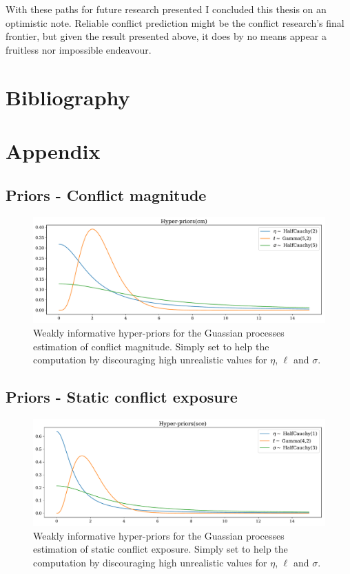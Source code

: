 \documentclass[a4paper]{article}
\begin{document}
With these paths for future research presented I concluded this thesis on an optimistic note. Reliable conflict prediction might be the conflict research's final frontier, but given the result presented above, it does by no means appear a fruitless nor impossible endeavour.\par


\pagebreak

\section{Bibliography}
 


\pagebreak
\section{Appendix}

\subsection{Priors - Conflict magnitude}\label{cmPrior}

\begin{figure}[!htb]
	\centering
	\includegraphics[scale=0.47]{Hyper-priors(cm).pdf}
    \caption{\footnotesize{Weakly informative hyper-priors for the Guassian processes estimation of conflict magnitude. Simply set to help the computation by discouraging high unrealistic values for $\eta$, $\ell$ and $\sigma$.}}
\end{figure}
\pagebreak

\subsection{Priors - Static conflict exposure}\label{scePrior}

\begin{figure}[!htb]
	\centering
	\includegraphics[scale=0.47]{Hyper-priors(sce).pdf}
    \caption{\footnotesize{Weakly informative hyper-priors for the Guassian processes estimation of static conflict exposure. Simply set to help the computation by discouraging high unrealistic values for $\eta$, $\ell$ and $\sigma$.}}
\end{figure}
\pagebreak
\end{document}
